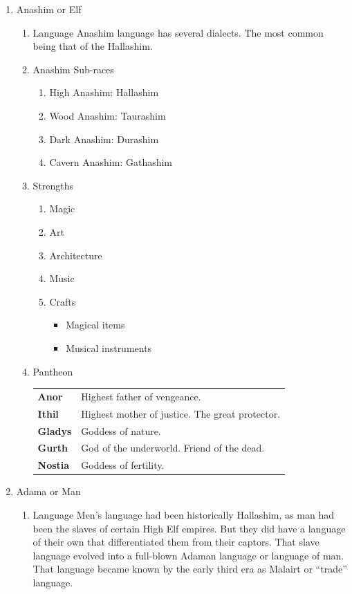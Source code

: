 \documentclass[11pt]{article}
\begin{document}
\begin{enumerate}
\item Anashim or Elf
\label{sec:orgb6c0043}
\begin{enumerate}
\item Language
\label{sec:orgb9b833d}
Anashim language has several dialects. The most common being that of the Hallashim.
\item Anashim Sub-races
\label{sec:orgbf5b809}
\begin{enumerate}
\item High Anashim: Hallashim
\item Wood Anashim: Taurashim
\item Dark Anashim: Durashim
\item Cavern Anashim: Gathashim
\end{enumerate}
\item Strengths
\label{sec:org2c22dd8}
\begin{enumerate}
\item Magic
\item Art
\item Architecture
\item Music
\item Crafts
\begin{itemize}
\item Magical items
\item Musical instruments
\end{itemize}
\end{enumerate}
\item Pantheon
\label{sec:org0d3a14e}
\begin{center}
\begin{tabular}{ll}
\textbf{Anor} & Highest father of vengeance.\\[0pt]
\textbf{Ithil} & Highest mother of justice. The great protector.\\[0pt]
\textbf{Gladys} & Goddess of nature.\\[0pt]
\textbf{Gurth} & God of the underworld. Friend of the dead.\\[0pt]
\textbf{Nostia} & Goddess of fertility.\\[0pt]
\end{tabular}
\end{center}
\end{enumerate}
\item Adama or Man
\label{sec:org18e27b4}
\begin{enumerate}
\item Language
\label{sec:orgc0cd966}
Men's language had been historically Hallashim, as man had been the slaves of certain High Elf empires. But they did have a language of their own that differentiated them from their captors. That slave language evolved into a full-blown Adaman language or language of man. That language became known by the early third era as Malairt or ``trade'' language.

\end{enumerate}
\end{enumerate}
\end{document}
